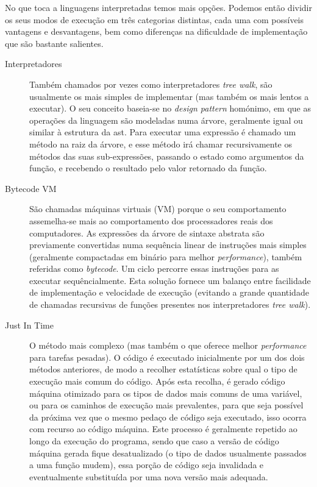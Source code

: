 No que toca a linguagens interpretadas temos mais opções. Podemos então dividir os seus modos de execução em três categorias distintas, cada uma com possíveis vantagens e desvantagens, bem como diferenças na dificuldade de implementação que são bastante salientes.
\begin{description}
 \item[Interpretadores] Também chamados por vezes como interpretadores \textit{tree walk}, são usualmente os mais simples de implementar (mas também os mais lentos a executar). O seu conceito baseia-se no \textit{design pattern} homónimo, em que as operações da linguagem são modeladas numa árvore, geralmente igual ou similar à estrutura da \acrshort{ast}. Para executar uma expressão é chamado um método na raiz da árvore, e esse método irá chamar recursivamente os métodos das suas sub-expressões, passando o estado como argumentos da função, e recebendo o resultado pelo valor retornado da função.
 \item[Bytecode VM] São chamadas máquinas virtuais (VM) porque o seu comportamento assemelha-se mais ao comportamento dos processadores reais dos computadores. As expressões da árvore de sintaxe abstrata são previamente convertidas numa sequência linear de instruções mais simples (geralmente compactadas em binário para melhor \textit{performance}), também referidas como \textit{bytecode}. Um ciclo percorre essas instruções para as executar sequêncialmente. Esta solução fornece um balanço entre facilidade de implementação e velocidade de execução (evitando a grande quantidade de chamadas recursivas de funções presentes nos interpretadores \textit{tree walk}).
 \item[Just In Time] O método mais complexo (mas também o que oferece melhor \textit{performance} para tarefas pesadas). O código é executado inicialmente por um dos dois métodos anteriores, de modo a recolher estatísticas sobre qual o tipo de execução mais comum do código. Após esta recolha, é gerado código máquina otimizado para os tipos de dados mais comuns de uma variável, ou para os caminhos de execução mais prevalentes, para que seja possível da próxima vez que o mesmo pedaço de código seja executado, isso ocorra com recurso ao código máquina. Este processo é geralmente repetido ao longo da execução do programa, sendo que caso a versão de código máquina gerada fique desatualizado (o tipo de dados usualmente passados a uma função mudem), essa porção de código seja invalidada e eventualmente substituída por uma nova versão mais adequada.
 \end{description}

